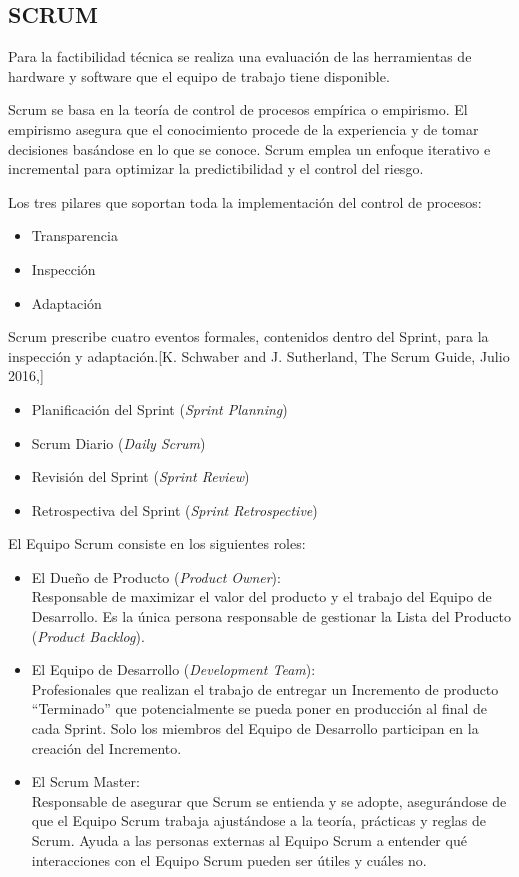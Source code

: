 \subsection{SCRUM}
Para la factibilidad técnica se realiza una evaluación de las herramientas de hardware  y software que el equipo de trabajo tiene disponible.

Scrum se basa en la teoría de control de procesos empírica o empirismo. El empirismo asegura que el conocimiento procede de la experiencia y de tomar decisiones basándose en lo que se conoce. Scrum emplea un enfoque iterativo e incremental para optimizar la predictibilidad y el control del riesgo. 

\noindent Los tres pilares que soportan toda la implementación del control de procesos: 
\begin{itemize}
	\item Transparencia
	\item Inspección
	\item Adaptación
\end{itemize}

\noindent Scrum prescribe cuatro eventos formales, contenidos dentro del Sprint, para la inspección y adaptación.[K. Schwaber and J. Sutherland, The Scrum Guide, Julio 2016,]
\begin{itemize}
	\item Planificación del Sprint (\textit{Sprint Planning}) 
	\item Scrum Diario (\textit{Daily Scrum}) 
	\item Revisión del Sprint (\textit{Sprint Review}) 
	\item Retrospectiva del Sprint (\textit{Sprint Retrospective})  			
\end{itemize}

\noindent El Equipo Scrum consiste en los siguientes roles:
\begin{itemize}
	\item El Dueño de Producto (\textit{Product Owner}):\\
	Responsable de maximizar el valor del producto y el trabajo del Equipo de Desarrollo. Es la única persona responsable de gestionar la Lista del Producto (\textit{Product Backlog}).
	\item El Equipo de Desarrollo (\textit{Development Team}):\\
	Profesionales que realizan el trabajo de entregar un Incremento de producto “Terminado” que potencialmente se pueda poner en producción al final de cada Sprint. Solo los miembros del Equipo de Desarrollo participan en la creación del Incremento. 
	\item  El Scrum Master:\\
	Responsable de asegurar que Scrum se entienda y se adopte, asegurándose de que el Equipo Scrum trabaja ajustándose a la teoría, prácticas y reglas de Scrum. Ayuda a las personas externas al Equipo Scrum a entender qué interacciones con el Equipo Scrum pueden ser útiles y cuáles no. 
\end{itemize}

